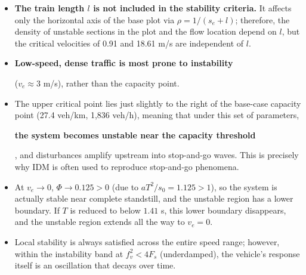 \documentclass[11pt,a4paper,openany]{book}
\numberwithin{equation}{chapter}
\numberwithin{figure}{chapter}
\numberwithin{table}{chapter}
\begin{document}
\begin{itemize}[leftmargin=1.4em,itemsep=3pt]
\item \textbf{The train length $l$ is not included in the stability criteria.} It affects only the horizontal axis of the base plot via $\rho = 1/(s_e+l)$; therefore, the density of unstable sections in the plot and the flow location depend on $l$, but the critical velocities of 0.91 and 18.61 m/s are independent of $l$.







\item \textbf{Low-speed, dense traffic is most prone to instability}




($v_e\approx3$ m/s), rather than the capacity point.







\item




The upper critical point lies just slightly to the right of the base-case capacity point (27.4 veh/km, 1,836 veh/h), meaning that under this set of parameters,




\textbf{the system becomes unstable near the capacity threshold}




, and disturbances amplify upstream into stop-and-go waves. This is precisely why IDM is often used to reproduce stop-and-go phenomena.







\item




At $v_e\to0$, $\Phi\to 0.125>0$ (due to $aT^2/s_0 = 1.125>1$), so the system is actually stable near complete standstill, and the unstable region has a lower boundary. If $T$ is reduced to below $1.41$ s, this lower boundary disappears, and the unstable region extends all the way to $v_e=0$.







\item




Local stability is always satisfied across the entire speed range; however, within the instability band at $f_v^2<4F_s$ (underdamped), the vehicle’s response itself is an oscillation that decays over time.


\end{itemize}
\end{document}
